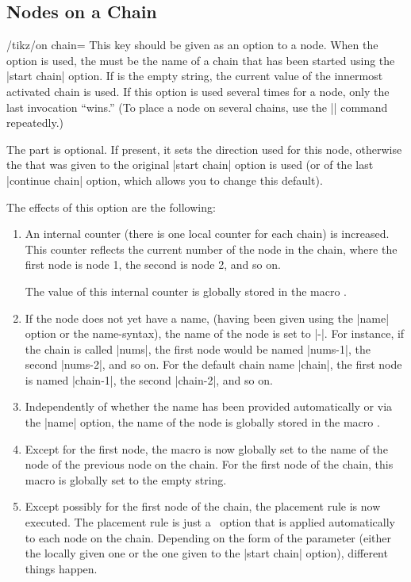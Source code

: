 \subsection{Nodes on a Chain}

\begin{key}{/tikz/on chain=}
  This key should be given as an option to a node. When the option is
  used, the  must be the name of a chain that has
  been started using the |start chain| option. If  is
  the empty string, the current value of the innermost activated chain
  is used. If this option is used several times for a node, only the
  last invocation ``wins.'' (To place a node on several chains, use
  the |\chainin| command repeatedly.)

  The  part is optional. If present, it sets the
  direction used for this node, otherwise the 
  that was given to the original |start chain| option is used (or of
  the last |continue chain| option, which allows you to change this
  default).

  The effects of this option are the following:
  \begin{enumerate}
  \item An internal counter (there is one local counter
    for each chain) is increased. This counter reflects the current
    number of the node in the chain, where the first node is node 1,
    the second is node 2, and so on.

    The value of this internal counter is globally stored in the
    macro \declare{|\tikzchaincount|}.
  \item If the node does not yet have a name, (having been given using
    the |name| option or the name-syntax), the name of the node is set to
    |-|. For instance, if the chain is called |nums|, the first
    node would be named |nums-1|, the second |nums-2|, and so on. For
    the default chain name |chain|, the first node is named |chain-1|,
    the second |chain-2|, and so on.
  \item Independently of whether the name has been provided
    automatically or via the |name| option, the name of the node is
    globally stored in the macro \declare{|\tikzchaincurrent|}.
  \item Except for the first node, the macro
    \declare{|\tikzchainprevious|} is now globally set to the name of
    the node of the previous node on the chain. For the first node of
    the chain, this macro is globally set to the empty string.
  \item Except possibly for the first node of the chain, the placement
    rule is now executed. The placement rule is just a \tikzname\ option
    that is applied automatically to each node on the chain. Depending
    on the form of the  parameter (either the locally
    given one or the one given to the |start chain| option), different
    things happen.


\end{enumerate}
\end{key}

